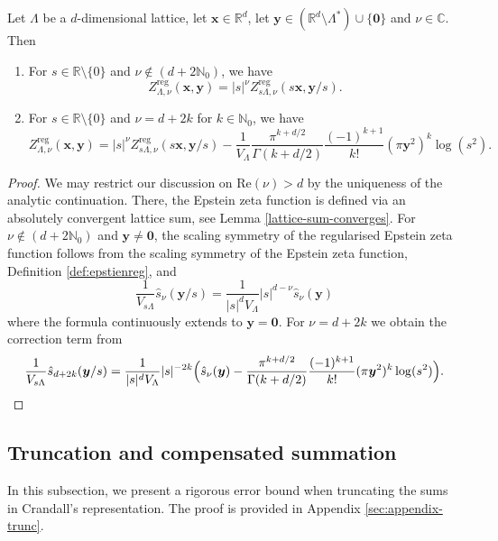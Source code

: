 \documentclass[]{amsart}
\newcommand{\new}[1]{#1}
\newcommand{\zepsr}[3]{\new{Z_{#1}^{\mathrm{reg}}(#2, #3)}}
\numberwithin{mythm}{section}
\begin{document}
\begin{corollary}
Let \(\Lambda\) be a \(d\)-dimensional lattice,
let \(\bm x\in\mathds{R}^d\),
let
$\bm y \in (\mathds R^d\setminus\Lambda^*)\cup\{\bm 0\}$ and $\nu\in\mathds C$.
Then 
\begin{enumerate}
    \item For $s\in\mathds R\setminus\{0\}$ and $\nu\notin (d+2\mathds N_0)$, we have
$$
\zepsr{\Lambda, \nu}{\bm x}{\bm y} = |s|^\nu \zepsr{s \Lambda, \nu}{s \bm x}{\bm y / s}.
$$
    \item For $s\in\mathds R\setminus\{0\}$ and $\nu= d+2k$ for $k\in\mathds N_0$, we have
$$
\zepsr{\Lambda, \nu}{\bm x}{\bm y} = |s|^\nu \zepsr{s \Lambda, \nu}{s \bm x}{\bm y / s}-
\frac1{V_{\Lambda}}\frac{\pi^{k+d/2}}{\Gamma(k+d/2)}\frac{(-1)^{k+1}}{k!} ( \pi \bm y^2 )^{k} \log (s^2)
.
$$
\end{enumerate}
\end{corollary}
\begin{proof}
We may restrict our discussion on $\mathrm{Re}(\nu)>d$ by the uniqueness of the analytic continuation. There, the Epstein zeta function is defined via an absolutely convergent lattice sum, see 
Lemma \ref{lattice-sum-converges}. 
For $\nu\notin (d+2\mathds N_0)$ and $\bm y\neq\bm 0$, the scaling symmetry of the regularised Epstein zeta function follows from the scaling symmetry of the Epstein zeta function, 
Definition \ref{def:epstienreg}, and 
$$
\frac1{V_{s\Lambda}}\hat{s}_{\nu}(\bm y/s)
=
\frac 1{|s|^dV_{\Lambda}}|s|^{d-\nu}\hat{s}_\nu(\bm y)
$$
where the formula continuously extends to $\bm y=\bm 0$.
For $\nu=d+2k$ we obtain the correction term from
\[
\frac1{V_{s\Lambda}}\hat{s}_{d+2k}(\bm y/s)
=
\frac1{|s|^{d}V_{\Lambda}}|s|^{-2k}\Big(\hat{s}_{\nu}(\bm y)
-
 \frac{\pi^{k+d/2}}{\Gamma(k+d/2)}\frac{(-1)^{k+1}}{k!} ( \pi \bm y^2 )^{k} \log (s^2)
 \Big).
\qedhere
\]
\end{proof}

\subsection{Truncation and compensated summation}
\label{sec:abwert}

In this subsection, we present a rigorous error bound when truncating the sums in Crandall's representation. The proof is provided in Appendix \ref{sec:appendix-trunc}.
\end{document}
